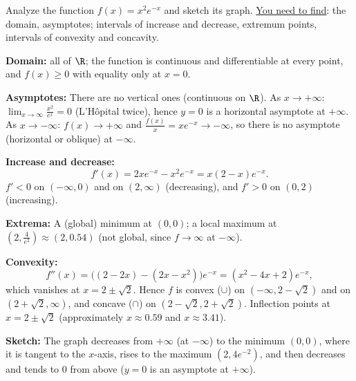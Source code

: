 
\begin{question}
Analyze the function $f(x)=x^2e^{-x}$ and sketch its graph.
\underline{You need to find}: the domain, asymptotes; intervals of increase and decrease, extremum points, intervals of convexity and concavity.
\end{question}

\begin{solution}
\textbf{Domain:} all of $\R$; the function is continuous and differentiable at every point, and $f(x)\ge0$ with equality only at $x=0$.

\textbf{Asymptotes:} There are no vertical ones (continuous on $\R$).
As $x\to+\infty$: $\lim_{x\to\infty}\frac{x^2}{e^x}=0$ (L'Hôpital twice), hence $y=0$ is a horizontal asymptote at $+\infty$.
As $x\to-\infty$: $f(x)\to+\infty$ and $\frac{f(x)}{x}=xe^{-x}\to-\infty$, so there is no asymptote (horizontal or oblique) at $-\infty$.

\textbf{Increase and decrease:}
\[
f'(x)=2xe^{-x}-x^2e^{-x}=x(2-x)e^{-x}.
\]
$f'<0$ on $(-\infty,0)$ and on $(2,\infty)$ (decreasing), and $f'>0$ on $(0,2)$ (increasing).

\textbf{Extrema:} A (global) minimum at $(0,0)$; a local maximum at $\left(2,\frac4{e^2}\right)\approx(2,0.54)$ (not global, since $f\to\infty$ at $-\infty$).

\textbf{Convexity:}
\[
f''(x)=\big((2-2x)-(2x-x^2)\big)e^{-x}=(x^2-4x+2)e^{-x},
\]
which vanishes at $x=2\pm\sqrt2$. Hence $f$ is convex ($\cup$) on $(-\infty,2-\sqrt2)$ and on $(2+\sqrt2,\infty)$, and concave ($\cap$) on $(2-\sqrt2,2+\sqrt2)$. Inflection points at $x=2\pm\sqrt2$ (approximately $x\approx0.59$ and $x\approx3.41$).

\textbf{Sketch:} The graph decreases from $+\infty$ (at $-\infty$) to the minimum $(0,0)$, where it is tangent to the $x$-axis, rises to the maximum $(2,4e^{-2})$, and then decreases and tends to $0$ from above ($y=0$ is an asymptote at $+\infty$).
\end{solution}
